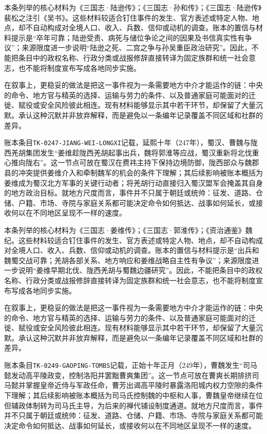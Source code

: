 本条列举的核心材料为《三国志·陆逊传》；《三国志·孙和传》；《三国志·陆逊传》裴松之注引《吴书》。这些材料较适合钉住事件的发生、官方表述或特定人物、地点，却不自动构成对全境人口、收入、兵数、信仰或动机的调查。账本的置信与材料提示是“卒年可靠；陆逊受责、病死与储位争论之间的因果及书信真实性有争议”；来源限度进一步说明“陆逊之死、二宫之争与孙吴重臣政治研究”。因此，不能把条目中的政权名称、行政分类或战报修辞直接转译为固定族群和统一社会意志，也不能将制度宣布写成各地同步实施。

在叙事上，更稳妥的做法是把这一事件视为一条需要地方中介才能运作的链：中央的命令、地方官与精英的选择、运输与劳力的条件、以及普通家庭可能面对的迁徙、赋役或安全风险彼此相连。现有材料能够显示其中若干环节，却保留了大量沉默。承认这种沉默并非放弃解释，而是避免以一条编年记录覆盖不同区域和社群的差异。

账本条目\texttt{TK-0247-JIANG-WEI-LONGXI}记载，延熙十年（247年），蜀汉、曹魏与陇西羌胡集团发生“姜维趁陇西羌胡起事出兵，魏将郭淮等应战，蜀汉重新将北伐重心推向陇右”。这一节点可放在蜀汉在费祎主持下保持边境防御，陇西部众与魏郡县的冲突提供姜维介入和牵制魏军的机会的条件下理解；其后续影响被账本概括为姜维成为蜀汉北方军事的关键行动者；将羌胡行动直接归入蜀汉盟军会掩盖其自身的地方政治目标。就地方尺度而言，事件并不只属于朝廷或统帅：征发、道路、仓储、户籍、市场、寺院与家庭关系都可能决定命令如何抵达、战事如何延长，或接收何以在不同地区呈现不一样的速度。

本条列举的核心材料为《三国志·姜维传》；《三国志·郭淮传》；《资治通鉴》魏纪。这些材料较适合钉住事件的发生、官方表述或特定人物、地点，却不自动构成对全境人口、收入、兵数、信仰或动机的调查。账本的置信与材料提示是“出兵和魏蜀交战可靠；羌胡各部关系、地方响应和姜维战略自主性有争议”；来源限度进一步说明“姜维早期北伐、陇西羌胡与蜀魏边疆研究”。因此，不能把条目中的政权名称、行政分类或战报修辞直接转译为固定族群和统一社会意志，也不能将制度宣布写成各地同步实施。

在叙事上，更稳妥的做法是把这一事件视为一条需要地方中介才能运作的链：中央的命令、地方官与精英的选择、运输与劳力的条件、以及普通家庭可能面对的迁徙、赋役或安全风险彼此相连。现有材料能够显示其中若干环节，却保留了大量沉默。承认这种沉默并非放弃解释，而是避免以一条编年记录覆盖不同区域和社群的差异。

账本条目\texttt{TK-0249-GAOPING-TOMBS}记载，正始十年正月（249年），曹魏发生“司马懿发动高平陵政变，控制洛阳并罢黜曹爽集团”。这一节点可放在曹爽长期排挤司马懿并掌握皇帝近侍与军政任命，曹芳出谒高平陵时暴露洛阳城内权力空隙的条件下理解；其后续影响被账本概括为司马氏控制魏的中枢和人事，曹魏皇帝继续在位但辅政体制转为司马氏主导，为后来的禅代铺设制度通道。就地方尺度而言，事件并不只属于朝廷或统帅：征发、道路、仓储、户籍、市场、寺院与家庭关系都可能决定命令如何抵达、战事如何延长，或接收何以在不同地区呈现不一样的速度。

